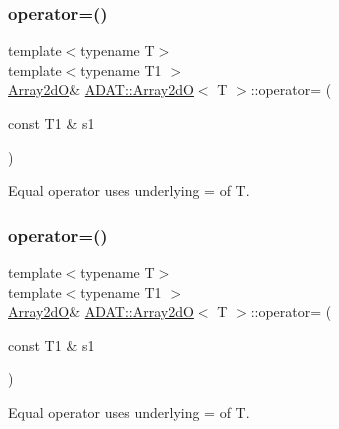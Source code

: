 \mbox{\label{classADAT_1_1Array2dO_a82bf731b5d6edfc53b941b5815647a6e}} 
\subsubsection{\texorpdfstring{operator=()}{operator=()}\hspace{0.1cm}{\footnotesize\ttfamily [3/4]}}
{\footnotesize\ttfamily template$<$typename T$>$ \\
template$<$typename T1 $>$ \\
\mbox{\hyperlink{classADAT_1_1Array2dO}{Array2dO}}\& \mbox{\hyperlink{classADAT_1_1Array2dO}{A\+D\+A\+T\+::\+Array2dO}}$<$ T $>$\+::operator= (\begin{DoxyParamCaption}\item[{const T1 \&}]{s1 }\end{DoxyParamCaption})\hspace{0.3cm}{\ttfamily [inline]}}



Equal operator uses underlying = of T. 

\mbox{\label{classADAT_1_1Array2dO_a82bf731b5d6edfc53b941b5815647a6e}} 
\subsubsection{\texorpdfstring{operator=()}{operator=()}\hspace{0.1cm}{\footnotesize\ttfamily [4/4]}}
{\footnotesize\ttfamily template$<$typename T$>$ \\
template$<$typename T1 $>$ \\
\mbox{\hyperlink{classADAT_1_1Array2dO}{Array2dO}}\& \mbox{\hyperlink{classADAT_1_1Array2dO}{A\+D\+A\+T\+::\+Array2dO}}$<$ T $>$\+::operator= (\begin{DoxyParamCaption}\item[{const T1 \&}]{s1 }\end{DoxyParamCaption})\hspace{0.3cm}{\ttfamily [inline]}}



Equal operator uses underlying = of T. 

